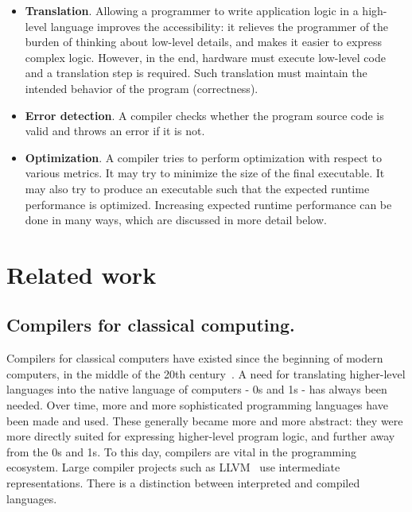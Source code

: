 \begin{itemize}

\item \textbf{Translation}.
Allowing a programmer to write application logic in a high-level language improves the accessibility:
it relieves the programmer of the burden of thinking about low-level details, and makes it easier to express complex logic.
However, in the end, hardware must execute low-level code and a translation step is required.
Such translation must maintain the intended behavior of the program (correctness).

\item \textbf{Error detection}.
A compiler checks whether the program source code is valid and throws an error if it is not.

\item \textbf{Optimization}.
A compiler tries to perform optimization with respect to various metrics.
It may try to minimize the size of the final executable.
It may also try to produce an executable such that the expected runtime performance is optimized.
Increasing expected runtime performance can be done in many ways, which are discussed in more detail below.

\end{itemize}



\section{Related work}


\subsection{Compilers for classical computing.}
Compilers for classical computers have existed since the beginning of modern computers, in the middle of the 20th century~\cite{aho_compilers_2006}.
A need for translating higher-level languages into the native language of computers - 0s and 1s - has always been needed.
Over time, more and more sophisticated programming languages have been made and used.
These generally became more and more abstract: they were more directly suited for expressing higher-level program logic, and further away from the 0s and 1s.
To this day, compilers are vital in the programming ecosystem.
Large compiler projects such as LLVM~\cite{lattner_llvm_2004} use intermediate representations.
There is a distinction between interpreted and compiled languages.

